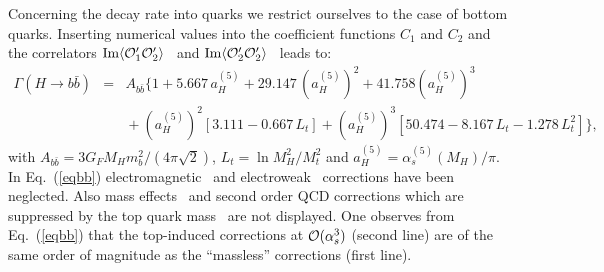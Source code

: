 Concerning the decay rate into quarks we restrict ourselves
to the case of bottom quarks. Inserting numerical values into the 
coefficient functions $C_1$ and $C_2$ and the correlators
$\mbox{Im}\langle {\cal O}_1^\prime {\cal O}_2^\prime\rangle$~\cite{CheSte97}
and
$\mbox{Im}\langle {\cal O}_2^\prime {\cal O}_2^\prime\rangle
$~\cite{Che97higgs,CheSte97}
leads to:
\begin{eqnarray}
\Gamma(H\to b\bar{b}) 
&=& 
A_{b\bar{b}}\Bigg\{
1
+ 5.667 \,  a_H^{(5)}
+ 29.147 \, \left(a_H^{(5)}\right)^2
+ 41.758 \left(a_H^{(5)}\right)^3
\label{eqbb}
\\&&\mbox{}
+\left(a_H^{(5)}\right)^2
\left[
3.111
-0.667\,L_t
\right] 
+\left(a_H^{(5)}\right)^3
\left[
50.474
-8.167\,L_t
-1.278\,L_t^2
\right]
\Bigg\},
\nonumber
\end{eqnarray}
with $A_{b\bar b}=3G_FM_Hm_b^2/(4\pi\sqrt{2})$,
$L_t=\ln M_H^2/M_t^2$ and $a_H^{(5)}=\alpha_s^{(5)}(M_H)/\pi$.
In Eq.~(\ref{eqbb})
electromagnetic~\cite{Kat97} and 
electroweak~\cite{KniSte95,CheKniSte97hbb}
corrections have been neglected. Also 
mass effects~\cite{HarSte97}
and second order QCD corrections which are suppressed by the 
top quark mass~\cite{LarRitVer95CheKwi96}
are not displayed.
One observes from Eq.~(\ref{eqbb}) that the top-induced corrections
at ${\cal O}(\alpha_s^3)$ (second line) are of the same order of magnitude
as the ``massless'' corrections (first line).













